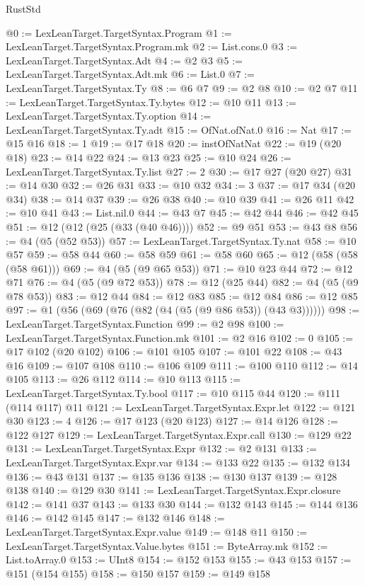 \begin{lexlean}{RustStd}
\begin{coremodule}
{\begin{coremodule}
{{{{{{{{{{{{{{{{{{{{{{{{{{{{{{{@0 := LexLeanTarget.TargetSyntax.Program
@1 := LexLeanTarget.TargetSyntax.Program.mk
@2 := List.cons.{0}
@3 := LexLeanTarget.TargetSyntax.Adt
@4 := @2 @3
@5 := LexLeanTarget.TargetSyntax.Adt.mk
@6 := List.{0}
@7 := LexLeanTarget.TargetSyntax.Ty
@8 := @6 @7
@9 := @2 @8
@10 := @2 @7
@11 := LexLeanTarget.TargetSyntax.Ty.bytes
@12 := @10 @11
@13 := LexLeanTarget.TargetSyntax.Ty.option
@14 := LexLeanTarget.TargetSyntax.Ty.adt
@15 := OfNat.ofNat.{0}
@16 := Nat
@17 := @15 @16
@18 := 1
@19 := @17 @18
@20 := instOfNatNat
@22 := @19 (@20 @18)
@23 := @14 @22
@24 := @13 @23
@25 := @10 @24
@26 := LexLeanTarget.TargetSyntax.Ty.list
@27 := 2
@30 := @17 @27 (@20 @27)
@31 := @14 @30
@32 := @26 @31
@33 := @10 @32
@34 := 3
@37 := @17 @34 (@20 @34)
@38 := @14 @37
@39 := @26 @38
@40 := @10 @39
@41 := @26 @11
@42 := @10 @41
@43 := List.nil.{0}
@44 := @43 @7
@45 := @42 @44
@46 := @42 @45
@51 := @12 (@12 (@25 (@33 (@40 @46))))
@52 := @9 @51
@53 := @43 @8
@56 := @4 (@5 (@52 @53))
@57 := LexLeanTarget.TargetSyntax.Ty.nat
@58 := @10 @57
@59 := @58 @44
@60 := @58 @59
@61 := @58 @60
@65 := @12 (@58 (@58 (@58 @61)))
@69 := @4 (@5 (@9 @65 @53))
@71 := @10 @23 @44
@72 := @12 @71
@76 := @4 (@5 (@9 @72 @53))
@78 := @12 (@25 @44)
@82 := @4 (@5 (@9 @78 @53))
@83 := @12 @44
@84 := @12 @83
@85 := @12 @84
@86 := @12 @85
@97 := @1 (@56 (@69 (@76 (@82 (@4 (@5 (@9 @86 @53)) (@43 @3))))))
@98 := LexLeanTarget.TargetSyntax.Function
@99 := @2 @98
@100 := LexLeanTarget.TargetSyntax.Function.mk
@101 := @2 @16
@102 := 0
@105 := @17 @102 (@20 @102)
@106 := @101 @105
@107 := @101 @22
@108 := @43 @16
@109 := @107 @108
@110 := @106 @109
@111 := @100 @110
@112 := @14 @105
@113 := @26 @112
@114 := @10 @113
@115 := LexLeanTarget.TargetSyntax.Ty.bool
@117 := @10 @115 @44
@120 := @111 (@114 @117) @11
@121 := LexLeanTarget.TargetSyntax.Expr.let
@122 := @121 @30
@123 := 4
@126 := @17 @123 (@20 @123)
@127 := @14 @126
@128 := @122 @127
@129 := LexLeanTarget.TargetSyntax.Expr.call
@130 := @129 @22
@131 := LexLeanTarget.TargetSyntax.Expr
@132 := @2 @131
@133 := LexLeanTarget.TargetSyntax.Expr.var
@134 := @133 @22
@135 := @132 @134
@136 := @43 @131
@137 := @135 @136
@138 := @130 @137
@139 := @128 @138
@140 := @129 @30
@141 := LexLeanTarget.TargetSyntax.Expr.closure
@142 := @141 @37
@143 := @133 @30
@144 := @132 @143
@145 := @144 @136
@146 := @142 @145
@147 := @132 @146
@148 := LexLeanTarget.TargetSyntax.Expr.value
@149 := @148 @11
@150 := LexLeanTarget.TargetSyntax.Value.bytes
@151 := ByteArray.mk
@152 := List.toArray.{0}
@153 := UInt8
@154 := @152 @153
@155 := @43 @153
@157 := @151 (@154 @155)
@158 := @150 @157
@159 := @149 @158
}}}}}}}}}}}}}}}}}}}}}}}}}}}}}}}
\end{coremodule}}
\end{coremodule}
\end{lexlean}
